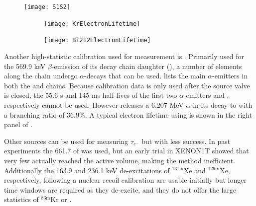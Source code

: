 \begin{figure}
\centering
\texttt{[image: S1S2]}
\label{fig:calibrations_kr_s1_s2}
\end{figure}

\begin{figure}
    \centering
    \begin{subfigure}[t]{0.45\textwidth}
        \centering
        \texttt{[image: KrElectronLifetime]}
    \end{subfigure}%
    \begin{subfigure}[t]{0.45\textwidth}
        \centering
        \texttt{[image: Bi212ElectronLifetime]}
    \end{subfigure}
    \caption{}
	\label{fig:calibrations_elifetime}
\end{figure}

Another high-statistic calibration used for measurement is .  Primarily used for the 569.9 keV $\beta$-emission of its
decay chain daughter  (), a number of elements along the chain
undergo $\alpha$-decays that can be
used.   lists the main $\alpha$-emitters in both the  and  chains.  Because calibration
data is only used after the source valve is closed, the 55.6 s and 145 ms half-lives of the first two $\alpha$-emitters  and
, respectively cannot be used.  However  releases a 6.207 MeV $\alpha$ in its decay to  with a
branching ratio of 36.9\%.  A typical electron lifetime using  is shown in the right panel of
.

Other sources can be used for measuring $\tau_{e^-}$ but with less success.  In past experiments the 661.7 \gammaray of  was
used, but an early trial in XENON1T showed that very few actually reached the active volume, making the method inefficient.  Additionally
the 163.9 and 236.1 keV de-excitations of $\mathrm{^{131m}Xe}$ and $\mathrm{^{129m}Xe}$, respectively, following a nuclear recoil calibration are
usable initially but longer time windows are required as they de-excite, and they do not offer the large statistics of $\mathrm{^{83m}Kr}$
or .

